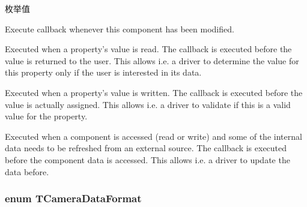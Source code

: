 \begin{Desc}
\item[枚举值]\par
\begin{description}
\item[{\em 
\hypertarget{group___common_interface_ggaf1a94f284c72087b450e648f1d532b3eaad2218765fe751eb14feefb22d5b1c61}{ct\+On\+Changed}\label{group___common_interface_ggaf1a94f284c72087b450e648f1d532b3eaad2218765fe751eb14feefb22d5b1c61}
}]Execute callback whenever this component has been modified. \item[{\em 
\hypertarget{group___common_interface_ggaf1a94f284c72087b450e648f1d532b3eac4d0b06476b7740286e6aab8a6cf3609}{ct\+On\+Read\+Data}\label{group___common_interface_ggaf1a94f284c72087b450e648f1d532b3eac4d0b06476b7740286e6aab8a6cf3609}
}]Executed when a property's value is read. The callback is executed before the value is returned to the user. This allows i.\+e. a driver to determine the value for this property only if the user is interested in its data. \item[{\em 
\hypertarget{group___common_interface_ggaf1a94f284c72087b450e648f1d532b3ea8297d97272b824a029bdcd0638a20524}{ct\+On\+Write\+Data}\label{group___common_interface_ggaf1a94f284c72087b450e648f1d532b3ea8297d97272b824a029bdcd0638a20524}
}]Executed when a property's value is written. The callback is executed before the value is actually assigned. This allows i.\+e. a driver to validate if this is a valid value for the property. \item[{\em 
\hypertarget{group___common_interface_ggaf1a94f284c72087b450e648f1d532b3ea28d40246e9bb74b83a98767fd6029ab8}{ct\+On\+Refresh\+Cache}\label{group___common_interface_ggaf1a94f284c72087b450e648f1d532b3ea28d40246e9bb74b83a98767fd6029ab8}
}]Executed when a component is accessed (read or write) and some of the internal data needs to be refreshed from an external source. The callback is executed before the component data is accessed. This allows i.\+e. a driver to update the data before. \end{description}
\end{Desc}
\hypertarget{group___common_interface_ga36f9b405563c51f817554819cf981699}{
\subsubsection[{T\+Camera\+Data\+Format}]{\setlength{\rightskip}{0pt plus 5cm}enum {\bf T\+Camera\+Data\+Format}}}\label{group___common_interface_ga36f9b405563c51f817554819cf981699}


